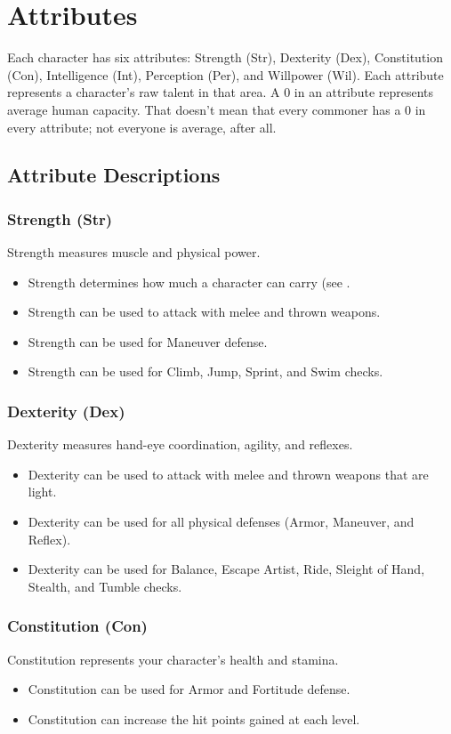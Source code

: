 \chapter{Attributes}
Each character has six attributes: Strength (Str), Dexterity (Dex), Constitution (Con), Intelligence (Int), Perception (Per), and Willpower (Wil). Each attribute represents a character's raw talent in that area. A 0 in an attribute represents average human capacity. That doesn't mean that every commoner has a 0 in every attribute; not everyone is average, after all.

\section{Attribute Descriptions}

\subsection{Strength (Str)}
Strength measures muscle and physical power.
\begin{itemize}
    \item Strength determines how much a character can carry (see .
    \item Strength can be used to attack with melee and thrown weapons.
    \item Strength can be used for Maneuver defense.
    \item Strength can be used for Climb, Jump, Sprint, and Swim checks.
\end{itemize}

\subsection{Dexterity (Dex)}
Dexterity measures hand-eye coordination, agility, and reflexes.
\begin{itemize}
    \item Dexterity can be used to attack with melee and thrown weapons that are light.
    \item Dexterity can be used for all physical defenses (Armor, Maneuver, and Reflex).
    \item Dexterity can be used for Balance, Escape Artist, Ride, Sleight of Hand, Stealth, and Tumble checks.
\end{itemize}

\subsection{Constitution (Con)}
Constitution represents your character's health and stamina.
\begin{itemize}
    \item Constitution can be used for Armor and Fortitude defense.
    \item Constitution can increase the hit points gained at each level.
\end{itemize}

